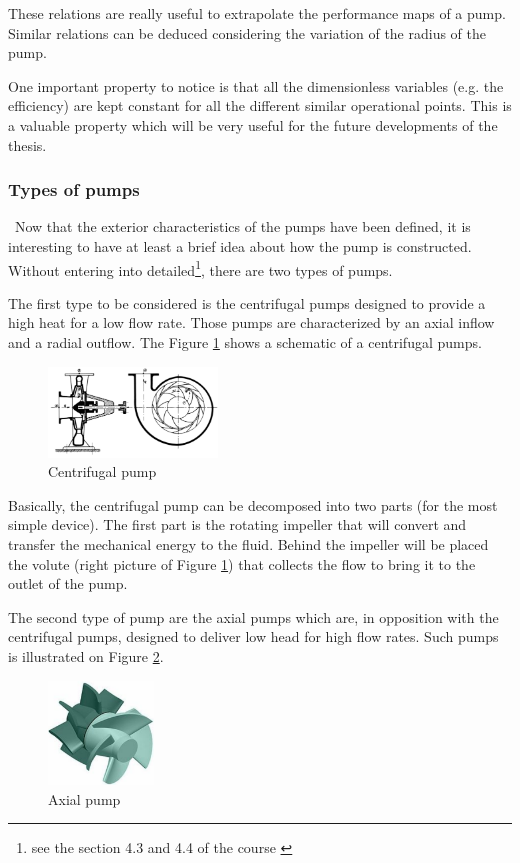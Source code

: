 These relations are really useful to extrapolate the performance maps of a pump. Similar relations can be deduced considering the variation of the radius of the pump.

One important property to notice is that all the dimensionless variables (e.g. the efficiency) are kept constant for all the different similar operational points. This is a valuable property which will be very useful for the future developments of the thesis.
\subsubsection{Types of pumps}
\quad\, Now that the exterior characteristics of the pumps have been defined, it is interesting to have at least a brief idea about how the pump is constructed. Without entering into detailed\footnote{see the section 4.3 and 4.4 of the course \citep{Hillewaert2019}}, there are two types of pumps.

The first type to be considered is the centrifugal pumps designed to provide a high heat for a low flow rate. Those pumps are characterized by an axial inflow and a radial outflow. The Figure \ref{fig:C3_centri_pump} shows a schematic of a centrifugal pumps.
\begin{figure}[h]
\centering
\includegraphics[width=0.4\textwidth]{centri_pump.png}
\caption{Centrifugal pump \citep{Hillewaert2019}}
\label{fig:C3_centri_pump}
\end{figure}

Basically, the centrifugal pump can be decomposed into two parts (for the most simple device). The first  part is the rotating impeller that will convert and transfer the mechanical energy to the fluid. Behind the impeller will be placed the volute (right picture of Figure \ref{fig:C3_centri_pump}) that collects the flow to bring it to the outlet of the pump.\newpage

The second type of pump are the axial pumps which are, in opposition with the centrifugal pumps, designed to deliver low head for high flow rates. Such pumps is illustrated on Figure \ref{fig:C3_axial_pump}. 
\begin{figure}[h!]
\centering
\includegraphics[width=0.25\textwidth]{axial_pump.png}
\caption{Axial pump \citep{Hillewaert2019}}
\label{fig:C3_axial_pump}
\end{figure}

